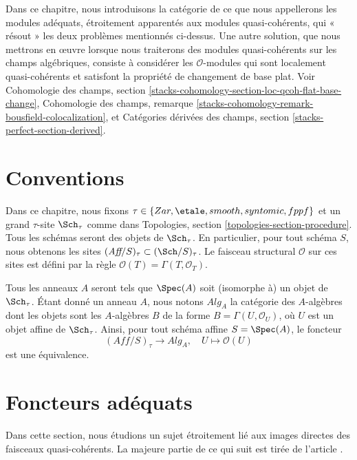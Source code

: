 \medskip\noindent
Dans ce chapitre, nous introduisons la catégorie de ce que nous appellerons
les modules adéquats, étroitement apparentés aux modules quasi-cohérents,
qui « résout » les deux problèmes mentionnés ci-dessus. Une autre solution,
que nous mettrons en œuvre lorsque nous traiterons des modules quasi-cohérents
sur les champs algébriques, consiste à considérer les $\mathcal{O}$-modules
qui sont localement quasi-cohérents et satisfont la propriété de changement
de base plat. Voir Cohomologie des champs, section
\ref{stacks-cohomology-section-loc-qcoh-flat-base-change},
Cohomologie des champs, remarque
\ref{stacks-cohomology-remark-bousfield-colocalization}, et
Catégories dérivées des champs, section
\ref{stacks-perfect-section-derived}.






\section{Conventions}
\label{section-conventions}

\noindent
Dans ce chapitre, nous fixons
$\tau \in \{Zar, \etale, smooth, syntomic, fppf\}$
et un grand $\tau$-site $\Sch_\tau$ comme dans
Topologies, section \ref{topologies-section-procedure}.
Tous les schémas seront des objets de $\Sch_\tau$.
En particulier, pour tout schéma $S$, nous obtenons les sites
$(\textit{Aff}/S)_\tau \subset (\Sch/S)_\tau$.
Le faisceau structural $\mathcal{O}$ sur ces sites est défini par
la règle $\mathcal{O}(T) = \Gamma(T, \mathcal{O}_T)$.

\medskip\noindent
Tous les anneaux $A$ seront tels que $\Spec(A)$ soit (isomorphe à) un
objet de $\Sch_\tau$. Étant donné un anneau $A$, nous notons
$\textit{Alg}_A$ la catégorie des $A$-algèbres dont les objets sont les
$A$-algèbres $B$ de la forme $B = \Gamma(U, \mathcal{O}_U)$,
où $U$ est un objet affine de $\Sch_\tau$. Ainsi, pour tout
schéma affine $S = \Spec(A)$, le foncteur
$$
(\textit{Aff}/S)_\tau \longrightarrow \textit{Alg}_A,
\quad
U \longmapsto \mathcal{O}(U)
$$
est une équivalence.





\section{Foncteurs adéquats}
\label{section-quasi-coherent}

\noindent
Dans cette section, nous étudions un sujet étroitement lié aux
images directes des faisceaux quasi-cohérents. La majeure partie de ce qui suit
est tirée de l'article \cite{Jaffe}.

